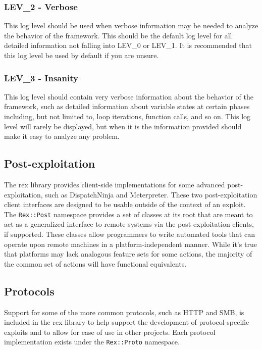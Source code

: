 \documentclass{report}
\begin{document}
            \subsubsection{LEV\_2 - Verbose}

This log level should be used when verbose information may be needed
to analyze the behavior of the framework.  This should be the
default log level for all detailed information not falling into
LEV\_0 or LEV\_1. It is recommended that this log level be used by
default if you are unsure.

            \subsubsection{LEV\_3 - Insanity}

This log level should contain very verbose information about the
behavior of the framework, such as detailed information about variable
states at certain phases including, but not limited to, loop iterations,
function calls, and so on.  This log level will rarely be displayed,
but when it is the information provided should make it easy to analyze
any problem.

        \subsection{Post-exploitation}

\par
The rex library provides client-side implementations for some
advanced post-exploitation, such as DispatchNinja and Meterpreter.
These two post-exploitation client interfaces are designed to be
usable outside of the context of an exploit.  The \texttt{Rex::Post}
namespace provides a set of classes at its root that are meant to
act as a generalized interface to remote systems via the
post-exploitation clients, if supported.  These classes allow
programmers to write automated tools that can operate upon remote
machines in a platform-independent manner.  While it's true that
platforms may lack analogous feature sets for some actions, the
majority of the common set of actions will have functional
equivalents.

        \subsection{Protocols}

\par
Support for some of the more common protocols, such as HTTP and SMB,
is included in the rex library to help support the development of
protocol-specific exploits and to allow for ease of use in other
projects.  Each protocol implementation exists under the
\texttt{Rex::Proto} namespace.
\end{document}
